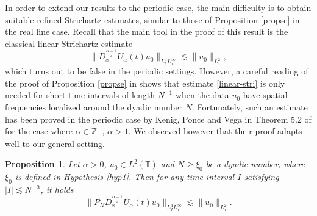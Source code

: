 \documentclass{amsart}
\newtheorem{proposition}[theorem]{Proposition}
\theoremstyle{definition}
\theoremstyle{remark}
\newcommand{\T}{\mathbb{T}}
\numberwithin{equation}{section}
\begin{document}
In order to extend our results to the periodic case, the main difficulty is to obtain suitable refined Strichartz estimates, similar to those of Proposition \ref{propse} in the real line case. Recall that the main tool in the proof of this result is the classical linear Strichartz estimate
\begin{equation}\label{linear-stri}
  \|D_x^{\frac{\alpha-1}4}U_\alpha(t)u_0\|_{L^4_t L^\infty_x} \lesssim \|u_0\|_{L^2_x},
\end{equation}
which turns out to be false in the periodic settings. However, a careful reading of the proof of Proposition \ref{propse} in \cite{MPV} shows that estimate \eqref{linear-stri} is only needed for short time intervals of length $N^{-1}$ when the data $u_0$ have spatial frequencies localized around the dyadic number $N$. Fortunately, such an estimate has been proved in the periodic case by Kenig, Ponce and Vega in Theorem 5.2 of \cite{KPV} for the case where $\alpha \in \mathbb Z_+$, $\alpha>1$. We observed however that their proof adapts well to our general setting.  
\begin{proposition}\label{prop:per-stri}
  Let $\alpha>0$, $u_0\in L^2(\T)$ and $N\ge \xi_0$ be a dyadic number, where $\xi_0$ is defined in Hypothesis \ref{hyp1}. Then for any time interval $I$ satisfying $|I|\lesssim N^{-\alpha}$, it holds
  \begin{equation}\label{per-stri}
    \|P_ND_x^{\frac{\alpha-1}4}U_\alpha(t)u_0\|_{L^4_I L^\infty_x} \lesssim \|u_0\|_{L^2_x}.
  \end{equation}
\end{proposition}
\end{document}
